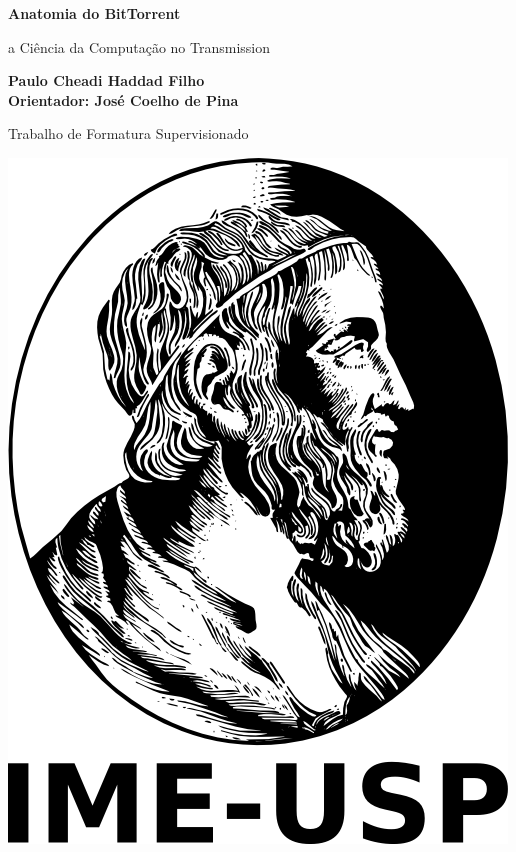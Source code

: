 \documentclass[a4paper,12pt,oneside]{book}
\begin{document}
\thispagestyle{empty}

\frontmatter
{}

%


\begin{titlepage}
    \begin{center}
        \vspace*{1cm}

        \Huge
        \textbf{Anatomia do BitTorrent}

        \vspace{0.5cm}
        \LARGE
        a Ciência da Computação no Transmission

        \vspace{2.5cm}

        \textbf{
            Paulo Cheadi Haddad Filho \\
            Orientador: José Coelho de Pina
        }

        \vfill

        Trabalho de Formatura Supervisionado

        \vspace{3.5cm}

        \includegraphics[scale=0.1]{logo-ime.png}


\end{center}
\end{titlepage}
\end{document}
